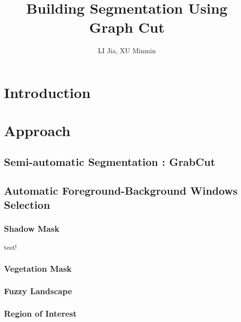 \documentclass[runningheads]{llncs}
\begin{document}
\pagestyle{headings}
\mainmatter
\def\ECCV14SubNumber{979}  %
\title{Building Segmentation Using Graph Cut}



\author{LI Jia, XU Minmin}


\maketitle

\section{Introduction}

\section{Approach}
\subsection{Semi-automatic Segmentation : GrabCut}
\subsection{Automatic Foreground-Background Windows Selection}
\subsubsection{Shadow Mask}

test!


\subsubsection{Vegetation Mask}
\subsubsection{Fuzzy Landscape}
\subsubsection{Region of Interest}
\end{document}
